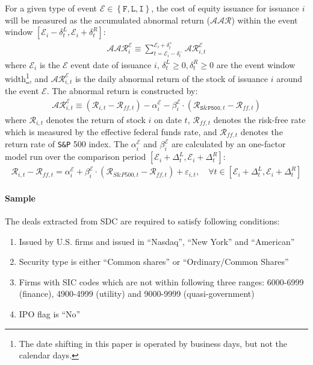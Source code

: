 \documentclass[11pt]{article}
\newcommand{\sumComp}[3]{\sum_{#1=#2}^{#3}}
\begin{document}
For a given type of event $ \mathcal{E}\in \left\{\mathtt{F},\mathtt{L},\mathtt{I}\right\} $, the cost of equity issuance for issuance $ i $ will be measured as the accumulated abnormal return ($ \mathcal{AAR} $) within the event window $ [\mathcal{E}_{i}-\delta^{L}_{t},\mathcal{E}_{i}+\delta^{R}_{t}] $:
\begin{align*}
	\mathcal{AAR}^{\mathcal{E}}_{i}\equiv \sumComp{t}{\mathcal{E}_{i}-\delta^{-}_{t}}{\mathcal{E}_{i}+\delta^{+}_{t}} \mathcal{AR}^{\mathcal{E}}_{i,t}
\end{align*}
where $ \mathcal{E}_{i} $ is the $ \mathcal{E} $ event date of issuance $ i $, $ \delta^{L}_{t}\geq 0, \delta^{R}_{t}\geq 0 $ are the event window width\footnote{The date shifting in this paper is operated by business days, but not the calendar days.}, and $ \mathcal{AR}^{\mathcal{E}}_{i,t} $ is the daily abnormal return of the stock of issuance $ i $ around the event $ \mathcal{E} $. The abnormal return is constructed by:
\begin{align*}
	\mathcal{AR}^{\mathcal{E}}_{i,t}\equiv (\mathcal{R}_{i,t}-\mathcal{R}_{ff,t})-\alpha^{\mathcal{E}}_{i}-\beta^{\mathcal{E}}_{i}\cdot \left(\mathcal{R}_{\mathtt{S\&P 500},t}-\mathcal{R}_{ff,t}\right)
\end{align*}
where $ \mathcal{R}_{i,t} $ denotes the return of stock $ i $ on date $ t $, $ \mathcal{R}_{ff,t} $ denotes the risk-free rate which is measured by the effective federal funds rate, and $ \mathcal{R}_{ff,t} $ denotes the return rate of \texttt{S\&P} 500 index. The $ \alpha^{\mathcal{E}}_{i} $ and $ \beta^{\mathcal{E}}_{i} $ are calculated by an one-factor model run over the comparison period $ [\mathcal{E}_{i}+\Delta_{t}^{L},\mathcal{E}_{i}+\Delta_{t}^{R}] $:
\begin{align*}
	\mathcal{R}_{i,t}-\mathcal{R}_{ff,t}=\alpha^{\mathcal{E}}_{i}+\beta^{\mathcal{E}}_{i}\cdot \left(\mathcal{R}_{S\&P 500,t}-\mathcal{R}_{ff,t}\right)+\varepsilon_{i,t},\quad \forall t\in [\mathcal{E}_{i}+\Delta_{t}^{L},\mathcal{E}_{i}+\Delta_{t}^{R}]
\end{align*}

\paragraph{Sample} The deals extracted from SDC are required to satisfy following conditions:
\begin{enumerate}
	\item Issued by U.S. firms and issued in ``Nasdaq'', ``New York'' and ``American''
	\item Security type is either ``Common shares'' or ``Ordinary/Common Shares''
	\item Firms with SIC codes which are not within following three ranges: 6000-6999 (finance), 4900-4999 (utility) and 9000-9999 (quasi-government)
	\item IPO flag is ``No''
\end{enumerate}
\end{document}
